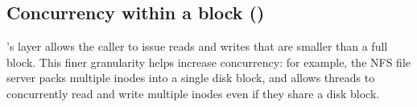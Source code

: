 %

\subsection{Concurrency within a block ()}
\label{s:proof:obj}

\txn's  layer allows the caller to issue reads and writes that
are smaller than a full block.  This finer granularity helps increase
concurrency: for example, the NFS file server packs multiple inodes into
a single disk block, and  allows threads to concurrently read
and write multiple inodes even if they share a disk block.

